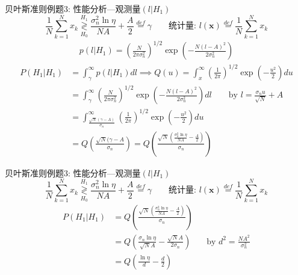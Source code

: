 \begin{frame}[shrink]{贝叶斯准则例题3: 性能分析---观测量$(l|H_1)$}
\[
\frac{1}{N}\sum\limits_{k=1}^{N}x_k\mathop{\gtrless}\limits_{H_0}^{H_1}\frac{\sigma_n^2\ln\eta}{NA}+\frac{A}{2}\mathop{=}\limits^{def}\gamma \qquad \textbf{统计量: }l(\bm{x})\mathop{=}\limits^{def}\frac{1}{N}\sum\limits_{k=1}^{N}x_k
\]
\begin{align*}
p(l|H_1)=\left(\frac{N}{2\pi\sigma_n^2}\right)^{1/2}\exp\left(-\frac{N(l-A)^2}{2\sigma_n^2}\right)
\end{align*}
\begin{align*}
P(H_1|H_1)&=\int_{\gamma}^{\infty}p(l|H_1)dl\implies Q(u)=\int_{x}^{\infty}\left(\frac{1}{2\pi}\right)^{1/2}\exp\left(-\frac{u^2}{2}\right)du\\
&=\int_{\gamma}^{\infty}\left(\frac{N}{2\pi\sigma_n^2}\right)^{1/2}\exp\left(-\frac{N(l-A)^2}{2\sigma_n^2}\right)dl\qquad \text{by } l=\frac{\sigma_nu}{\sqrt{N}}+A\\
&=\int_{\frac{\sqrt{N}(\gamma-A)}{\sigma_n}}^{\infty}\left(\frac{1}{2\pi}\right)^{1/2}\exp\left(-\frac{u^2}{2}\right)du\\
&=Q\left(\frac{\sqrt{N}(\gamma-A}{\sigma_n}\right)=Q\left(\frac{\sqrt{N}\left(\frac{\sigma_n^2\ln\eta}{NA}-\frac{A}{2}\right)}{\sigma_n}\right)
\end{align*}
\end{frame}

\begin{frame}[shrink]{贝叶斯准则例题3: 性能分析---观测量$(l|H_1)$}
\[
\frac{1}{N}\sum\limits_{k=1}^{N}x_k\mathop{\gtrless}\limits_{H_0}^{H_1}\frac{\sigma_n^2\ln\eta}{NA}+\frac{A}{2}\mathop{=}\limits^{def}\gamma \qquad \textbf{统计量: }l(\bm{x})\mathop{=}\limits^{def}\frac{1}{N}\sum\limits_{k=1}^{N}x_k
\]
\begin{align*}
P(H_1|H_1)&=Q\left(\frac{\sqrt{N}\left(\frac{\sigma_n^2\ln\eta}{NA}-\frac{A}{2}\right)}{\sigma_n}\right)\\
&=Q\left(\frac{\sigma_n\ln\eta}{\sqrt{N}A}-\frac{\sqrt{N}A}{2\sigma_n}\right)&& \text{by }d^2=\frac{NA^2}{\sigma_n^2}\\
&=Q\left(\frac{\ln\eta}{d}-\frac{d}{2}\right)
\end{align*}
\end{frame}

